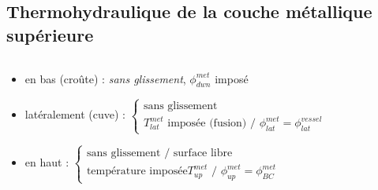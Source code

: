 \subsection{Thermohydraulique de la couche métallique supérieure}
\begin{frame}[fragile]
\begin{columns}[T]
    \begin{column}{0.7\textwidth}  
    \begin{scriptsize}
    \begin{itemize}
    \item en bas (croûte) : \textit{sans glissement}, $\phi^{met}_{dwn}$ imposé
    \item latéralement (cuve) : {\scriptsize $\left\{\begin{array}{l} \text{sans glissement} \\ T^{met}_{lat} \text{ imposée (fusion) / } \phi^{met}_{lat}=\phi^{vessel}_{lat} \end{array}\right.$}
    \item en haut : {\scriptsize $\left\{\begin{array}{l} \text{sans glissement / surface libre} \\ \text{température imposée} T^{met}_{up} \text{ / } \phi^{met}_{up}=\phi^{met}_{BC} \end{array}\right.$}

\end{itemize}
\end{scriptsize}
\end{column}
\end{columns}
\end{frame}
